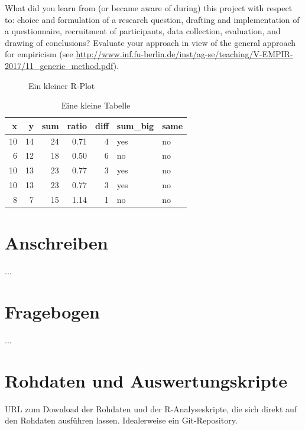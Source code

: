 \documentclass[de]{agse-empir-report}\usepackage[]{graphicx}\usepackage[]{color}
\makeatletter
\newenvironment{kframe}{%
 \def\at@end@of@kframe{}%
 \ifinner\ifhmode%
  \def\at@end@of@kframe{\end{minipage}}%
  \begin{minipage}{\columnwidth}%
 \fi\fi%
 \def\FrameCommand##1{\hskip\@totalleftmargin \hskip-\fboxsep
 \colorbox{shadecolor}{##1}\hskip-\fboxsep
     \hskip-\linewidth \hskip-\@totalleftmargin \hskip\columnwidth}%
 \MakeFramed {\advance\hsize-\width
   \@totalleftmargin\z@ \linewidth\hsize
   \@setminipage}}%
 {\par\unskip\endMakeFramed%
 \at@end@of@kframe}
\newenvironment{knitrout}{}{} %
\makeatother
\begin{document}
What did you learn from (or became aware of during) this project with
respect to: choice and formulation of a research question,
drafting and implementation of a questionnaire,
recruitment of participants,
data collection, evaluation, and drawing of conclusions?
Evaluate your approach in view of the general approach for
empiricism (see
\url{http://www.inf.fu-berlin.de/inst/ag-se/teaching/V-EMPIR-2017/11_generic_method.pdf}).

\lipsum[11-13]

\begin{figure}
\begin{knitrout}
\color{fgcolor}\begin{kframe}


{\ttfamily\noindent\bfseries{}}

{\ttfamily\noindent\bfseries{}}

{\ttfamily\noindent\bfseries\color{errorcolor}{\#\# Error in print(plt): Objekt 'plt' nicht gefunden}}\end{kframe}
\end{knitrout}
    \caption{Ein kleiner R-Plot}
\end{figure}

\begin{table}
    \centering
\begin{knitrout}
\color{fgcolor}
\begin{tabular}{rrrrrll}
\toprule
x & y & sum & ratio & diff & sum\_big & same\\
\midrule
10 & 14 & 24 & 0.71 & 4 & yes & no\\
6 & 12 & 18 & 0.50 & 6 & no & no\\
10 & 13 & 23 & 0.77 & 3 & yes & no\\
10 & 13 & 23 & 0.77 & 3 & yes & no\\
8 & 7 & 15 & 1.14 & 1 & no & no\\
\bottomrule
\end{tabular}


\end{knitrout}
    \caption{Eine kleine Tabelle}
\end{table}

\nocite{*}




\appendix

\section{Anschreiben}

...


\section{Fragebogen}

...


\section{Rohdaten und Auswertungskripte}

URL zum Download der Rohdaten und der R-Analyseskripte, die sich direkt auf den
Rohdaten ausführen lassen.
Idealerweise ein Git-Repository.
\end{document}
